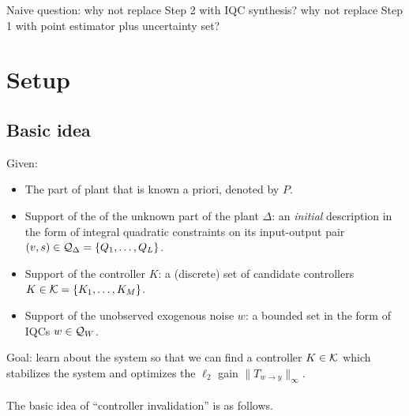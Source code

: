 \documentclass[11pt, onecolumn]{article}
\begin{document}
Naive question: why not replace Step 2 with IQC synthesis? why not replace Step 1 with point
estimator plus uncertainty set?

\newpage

\section{Setup}

\subsection{Basic idea}

Given:
\begin{itemize}
\item The part of plant that is known a priori, denoted by $P$.
\item Support of the of the unknown part of the plant $\Delta$: an {\em initial} description in the
  form of integral quadratic constraints on its input-output pair $(v,s)\in \mathcal Q_\Delta = \{Q_1,\dots, Q_L\}$.
\item Support of the controller $K$: a (discrete) set of candidate controllers $K \in \mathcal K = \{K_1,\dots,
  K_M\}$.
\item Support of the unobserved exogenous noise $w$: a bounded set in the form of IQCs $w\in \mathcal
  Q_{W}$.
\end{itemize}
Goal: learn about the system so that we can find a controller $K\in\mathcal K$ which stabilizes the
system and optimizes the $\ell_2$ gain $\|T_{w\to y}\|_{\infty}$.

\paragraph{}
The basic idea of ``controller invalidation'' is as follows.
\end{document}
